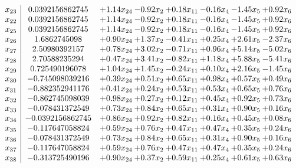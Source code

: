 \documentclass[8pt]{article}
\begin{document}
\[\begin{array}{c| c c@{\hskip 2pt} c@{\hskip 2pt} c@{\hskip 2pt} c@{\hskip 2pt} c@{\hskip 2pt} c@{\hskip 2pt} }
 x_{23}   &  0.0392156862745 & +  1.14 x_{24} & -0.92 x_{2} & +  0.18 x_{11} & -0.16 x_{4} & -1.45 x_{5} & +  0.92 x_{6}\\
 x_{22}   &  0.0392156862745 & +  1.14 x_{24} & -0.92 x_{2} & +  0.18 x_{11} & -0.16 x_{4} & -1.45 x_{5} & +  0.92 x_{6}\\
 x_{25}   &  0.0392156862745 & +  1.14 x_{24} & -0.92 x_{2} & +  0.18 x_{11} & -0.16 x_{4} & -1.45 x_{5} & +  0.92 x_{6}\\
 x_{26}   &  1.6862745098 & +  0.90 x_{24} & +  1.37 x_{2} & -0.41 x_{11} & +  0.25 x_{4} & +  2.61 x_{5} & -2.37 x_{6}\\
 x_{27}   &  2.50980392157 & +  0.78 x_{24} & +  3.02 x_{2} & -0.71 x_{11} & +  0.96 x_{4} & +  5.14 x_{5} & -5.02 x_{6}\\
 x_{28}   &  2.70588235294 & +  0.47 x_{24} & +  3.41 x_{2} & -0.82 x_{11} & +  1.18 x_{4} & +  5.88 x_{5} & -5.41 x_{6}\\
 x_{29}   &  0.725490196078 & +  1.04 x_{24} & +  1.45 x_{2} & -0.24 x_{11} & +  0.10 x_{4} & +  2.16 x_{5} & -1.45 x_{6}\\
 x_{30}   &  -0.745098039216 & +  0.39 x_{24} & +  0.51 x_{2} & +  0.65 x_{11} & +  0.98 x_{4} & +  0.57 x_{5} & +  0.49 x_{6}\\
 x_{31}   &  -0.882352941176 & +  0.41 x_{24} & +  0.24 x_{2} & +  0.53 x_{11} & +  0.53 x_{4} & +  0.65 x_{5} & +  0.76 x_{6}\\
 x_{32}   &  -0.862745098039 & +  0.98 x_{24} & +  0.27 x_{2} & +  0.12 x_{11} & +  0.45 x_{4} & +  0.92 x_{5} & +  0.73 x_{6}\\
 x_{33}   &  -0.078431372549 & +  0.73 x_{24} & +  0.84 x_{2} & +  0.65 x_{11} & +  0.31 x_{4} & +  0.90 x_{5} & +  0.16 x_{6}\\
 x_{34}   &  -0.0392156862745 & +  0.86 x_{24} & +  0.92 x_{2} & +  0.82 x_{11} & +  0.16 x_{4} & +  0.45 x_{5} & +  0.08 x_{6}\\
 x_{35}   &  -0.117647058824 & +  0.59 x_{24} & +  0.76 x_{2} & +  0.47 x_{11} & +  0.47 x_{4} & +  0.35 x_{5} & +  0.24 x_{6}\\
 x_{36}   &  -0.078431372549 & +  0.73 x_{24} & +  0.84 x_{2} & +  0.65 x_{11} & +  0.31 x_{4} & +  0.90 x_{5} & +  0.16 x_{6}\\
 x_{37}   &  -0.117647058824 & +  0.59 x_{24} & +  0.76 x_{2} & +  0.47 x_{11} & +  0.47 x_{4} & +  0.35 x_{5} & +  0.24 x_{6}\\
 x_{38}   &  -0.313725490196 & +  0.90 x_{24} & +  0.37 x_{2} & +  0.59 x_{11} & +  0.25 x_{4} & +  0.61 x_{5} & +  0.63 x_{6}\\

\end{array}\]
\end{document}
